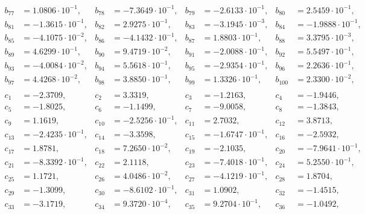 \begin{align*}
b_{ 77 } &= 1.0806 \cdot 10^{ -1 }, & b_{ 78 } &= -7.3649 \cdot 10^{ -1 }, & b_{ 79 } &= -2.6133 \cdot 10^{ -1 }, & b_{ 80 } &= 2.5459 \cdot 10^{ -1 },\\ 
b_{ 81 } &= -1.3615 \cdot 10^{ -1 }, & b_{ 82 } &= 2.9275 \cdot 10^{ -1 }, & b_{ 83 } &= -3.1945 \cdot 10^{ -3 }, & b_{ 84 } &= -1.9888 \cdot 10^{ -1 },\\ 
b_{ 85 } &= -4.1075 \cdot 10^{ -2 }, & b_{ 86 } &= -4.1432 \cdot 10^{ -1 }, & b_{ 87 } &= 1.8803 \cdot 10^{ -1 }, & b_{ 88 } &= 3.3795 \cdot 10^{ -3 },\\ 
b_{ 89 } &= 4.6299 \cdot 10^{ -1 }, & b_{ 90 } &= 9.4719 \cdot 10^{ -2 }, & b_{ 91 } &= -2.0088 \cdot 10^{ -1 }, & b_{ 92 } &= 5.5497 \cdot 10^{ -1 },\\ 
b_{ 93 } &= -4.0084 \cdot 10^{ -2 }, & b_{ 94 } &= 5.5618 \cdot 10^{ -1 }, & b_{ 95 } &= -2.9354 \cdot 10^{ -1 }, & b_{ 96 } &= 2.2636 \cdot 10^{ -1 },\\ 
b_{ 97 } &= 4.4268 \cdot 10^{ -2 }, & b_{ 98 } &= 3.8850 \cdot 10^{ -1 }, & b_{ 99 } &= 1.3326 \cdot 10^{ -1 }, & b_{ 100 } &= 2.3300 \cdot 10^{ -2 },\\ 
&&&&&&& \\ 
c_{ 1 } &= -2.3709, & c_{ 2 } &= 3.3319, & c_{ 3 } &= -1.2163, & c_{ 4 } &= -1.9446,\\ 
c_{ 5 } &= -1.8025, & c_{ 6 } &= -1.1499, & c_{ 7 } &= -9.0058, & c_{ 8 } &= -1.3843,\\ 
c_{ 9 } &= 1.1619, & c_{ 10 } &= -2.5256 \cdot 10^{ -1 }, & c_{ 11 } &= 2.7032, & c_{ 12 } &= 3.8713,\\ 
c_{ 13 } &= -2.4235 \cdot 10^{ -1 }, & c_{ 14 } &= -3.3598, & c_{ 15 } &= -1.6747 \cdot 10^{ -1 }, & c_{ 16 } &= -2.5932,\\ 
c_{ 17 } &= 1.8781, & c_{ 18 } &= 7.2650 \cdot 10^{ -2 }, & c_{ 19 } &= -2.1035, & c_{ 20 } &= -7.9641 \cdot 10^{ -1 },\\ 
c_{ 21 } &= -8.3392 \cdot 10^{ -1 }, & c_{ 22 } &= 2.1118, & c_{ 23 } &= -7.4018 \cdot 10^{ -1 }, & c_{ 24 } &= 5.2550 \cdot 10^{ -1 },\\ 
c_{ 25 } &= 1.1721, & c_{ 26 } &= 4.0486 \cdot 10^{ -2 }, & c_{ 27 } &= -4.1219 \cdot 10^{ -1 }, & c_{ 28 } &= 1.8704,\\ 
c_{ 29 } &= -1.3099, & c_{ 30 } &= -8.6102 \cdot 10^{ -1 }, & c_{ 31 } &= 1.0902, & c_{ 32 } &= -1.4515,\\ 
c_{ 33 } &= -3.1719, & c_{ 34 } &= 9.3720 \cdot 10^{ -4 }, & c_{ 35 } &= 9.2704 \cdot 10^{ -1 }, & c_{ 36 } &= -1.0492,\\ 

\end{align*}
